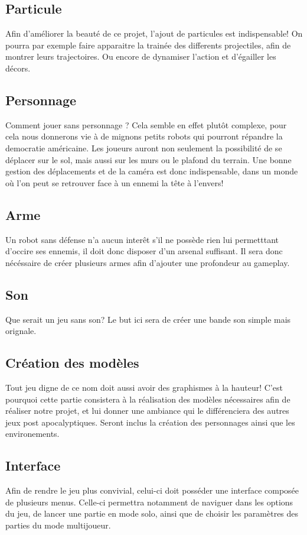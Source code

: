 ﻿\documentclass[12pt]{article}
\begin{document}
\subsection{Particule}
Aﬁn d’améliorer la beauté de ce projet, l’ajout de particules est indispensable!
On pourra par exemple faire apparaitre la trainée des differents projectiles, aﬁn de
montrer leurs trajectoires. Ou encore de dynamiser l’action et d’égailler les décors.

\subsection{Personnage}
Comment jouer sans personnage ? Cela semble en effet plutôt complexe, pour cela
nous donnerons vie à de mignons petits robots qui pourront répandre la democratie
américaine. Les joueurs auront non seulement la possibilité de se déplacer sur le sol,
mais aussi sur les murs ou le plafond du terrain. Une bonne gestion des déplacements
et de la caméra est donc indispensable, dans un monde où l’on peut se retrouver face
à un ennemi la tête à l’envers!

\subsection{Arme}
Un robot sans défense n’a aucun interêt s’il ne possède rien lui permetttant
d’occire ses ennemis, il doit donc disposer d’un arsenal suﬃsant. Il sera donc
nécéssaire de créer plusieurs armes aﬁn d’ajouter une profondeur au gameplay.

\subsection{Son}
Que serait un jeu sans son? Le but ici sera de créer une bande son simple mais orignale.

\subsection{Création des modèles}
Tout jeu digne de ce nom doit aussi avoir des graphismes à la hauteur! C’est pourquoi
cette partie consistera à la réalisation des modèles nécessaires aﬁn de réaliser
notre projet, et lui donner une ambiance qui le différenciera des autres jeux post
apocalyptiques. Seront inclus la création des personnages ainsi que les environements.

\subsection{Interface}
Aﬁn de rendre le jeu plus convivial, celui-ci doit posséder une interface composée
de plusieurs menus. Celle-ci permettra notamment de naviguer dans les options du jeu,
de lancer une partie en mode solo, ainsi que de choisir les paramètres des parties
du mode multijoueur.
\end{document}
